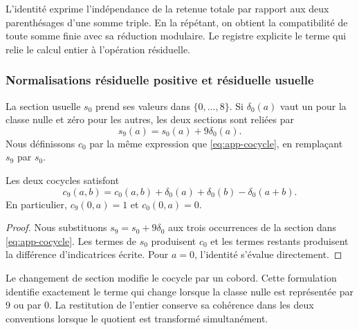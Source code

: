 L'identité exprime l'indépendance de la retenue totale par rapport aux deux parenthésages d'une somme triple. En la répétant, on obtient la compatibilité de toute somme finie avec sa réduction modulaire. Le registre explicite le terme qui relie le calcul entier à l'opération résiduelle.

\subsubsection{Normalisations résiduelle positive et résiduelle usuelle}

La section usuelle $s_0$ prend ses valeurs dans $\{0,\ldots,8\}$. Si $\delta_0(a)$ vaut un pour la classe nulle et zéro pour les autres, les deux sections sont reliées par
\begin{equation}
 s_9(a)=s_0(a)+9\delta_0(a).
\end{equation}
Nous définissons $c_0$ par la même expression que \eqref{eq:app-cocycle}, en remplaçant $s_9$ par $s_0$.

\begin{bloqueindivisible}
\begin{proposicion}
\label{prop:app-cambio-seccion}
Les deux cocycles satisfont
\begin{equation}
 c_9(a,b)=c_0(a,b)+\delta_0(a)+\delta_0(b)-\delta_0(a+b).
 \label{eq:app-section-change}
\end{equation}
En particulier, $c_9(0,a)=1$ et $c_0(0,a)=0$.
\end{proposicion}

\begin{proof}
Nous substituons $s_9=s_0+9\delta_0$ aux trois occurrences de la section dans \eqref{eq:app-cocycle}. Les termes de $s_0$ produisent $c_0$ et les termes restants produisent la différence d'indicatrices écrite. Pour $a=0$, l'identité s'évalue directement.
\end{proof}
\end{bloqueindivisible}

Le changement de section modifie le cocycle par un cobord. Cette formulation identifie exactement le terme qui change lorsque la classe nulle est représentée par $9$ ou par $0$. La restitution de l'entier conserve sa cohérence dans les deux conventions lorsque le quotient est transformé simultanément.

